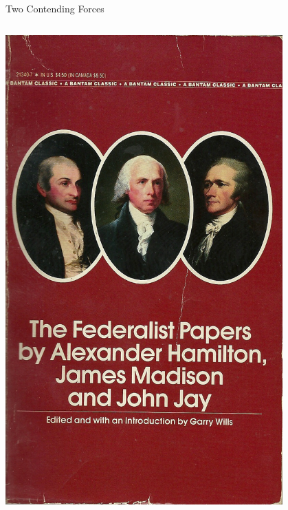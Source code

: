 \begin{frame}{Two Contending Forces}
    \begin{columns}[onlytextwidth]
            \includegraphics[width=0.8\textwidth]{img/federalistpapers.jpg} \\


\end{columns}
\end{frame}

